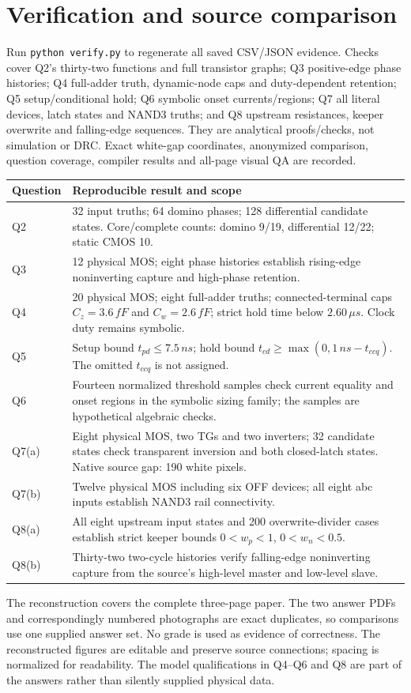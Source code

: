 \documentclass[10pt]{article}
\begin{document}
\section*{Verification and source comparison}
Run \texttt{python verify.py} to regenerate all saved CSV/JSON evidence. Checks cover Q2's thirty-two functions and full transistor graphs; Q3 positive-edge phase histories; Q4 full-adder truth, dynamic-node caps and duty-dependent retention; Q5 setup/conditional hold; Q6 symbolic onset currents/regions; Q7 all literal devices, latch states and NAND3 truths; and Q8 upstream resistances, keeper overwrite and falling-edge sequences. They are analytical proofs/checks, not simulation or DRC. Exact white-gap coordinates, anonymized comparison, question coverage, compiler results and all-page visual QA are recorded.

\begin{center}\begin{tabular}{lp{11.5cm}}\toprule
Question&Reproducible result and scope\\\midrule
Q2&32 input truths; 64 domino phases; 128 differential candidate states. Core/complete counts: domino 9/19, differential 12/22; static CMOS 10.\\
Q3&12 physical MOS; eight phase histories establish rising-edge noninverting capture and high-phase retention.\\
Q4&20 physical MOS; eight full-adder truths; connected-terminal caps $C_z=3.6\,fF$ and $C_w=2.6\,fF$; strict hold time below $2.60\,\mu s$. Clock duty remains symbolic.\\
Q5&Setup bound $t_{pd}\le7.5\,ns$; hold bound $t_{cd}\ge\max(0,1\,ns-t_{ccq})$. The omitted $t_{ccq}$ is not assigned.\\
Q6&Fourteen normalized threshold samples check current equality and onset regions in the symbolic sizing family; the samples are hypothetical algebraic checks.\\
Q7(a)&Eight physical MOS, two TGs and two inverters; 32 candidate states check transparent inversion and both closed-latch states. Native source gap: 190 white pixels.\\
Q7(b)&Twelve physical MOS including six OFF devices; all eight abc inputs establish NAND3 rail connectivity.\\
Q8(a)&All eight upstream input states and 200 overwrite-divider cases establish strict keeper bounds $0<w_p<1$, $0<w_n<0.5$.\\
Q8(b)&Thirty-two two-cycle histories verify falling-edge noninverting capture from the source's high-level master and low-level slave.\\\bottomrule
\end{tabular}\end{center}

The reconstruction covers the complete three-page paper. The two answer PDFs and correspondingly numbered photographs are exact duplicates, so comparisons use one supplied answer set. No grade is used as evidence of correctness. The reconstructed figures are editable and preserve source connections; spacing is normalized for readability. The model qualifications in Q4--Q6 and Q8 are part of the answers rather than silently supplied physical data.
\end{document}
